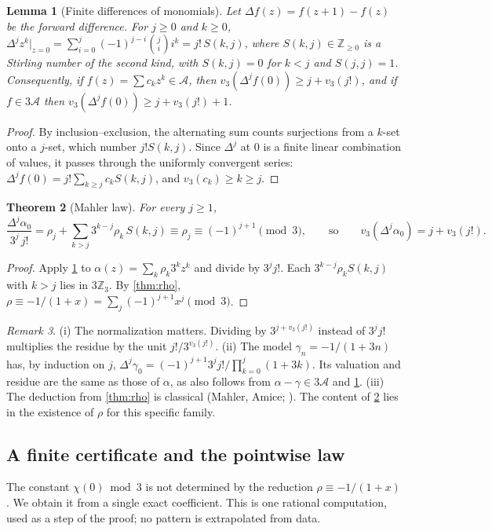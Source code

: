 \documentclass[11pt,reqno]{amsart}
\newtheorem{theorem}{Theorem}[section]
\newtheorem{lemma}[theorem]{Lemma}
\theoremstyle{definition}
\theoremstyle{remark}
\newtheorem{remark}[theorem]{Remark}
\theoremstyle{plain}
\newcommand{\Z}{\mathbb Z}
\newcommand{\cA}{\mathcal A}
\begin{document}
\begin{lemma}[Finite differences of monomials]\label{lem:mahler}
Let $\Delta f(z)=f(z+1)-f(z)$ be the forward difference. For $j\ge0$ and $k\ge0$, $\Delta^jz^k\big|_{z=0}=\sum_{i=0}^j(-1)^{j-i}\binom jii^k=j!\,S(k,j)$, where $S(k,j)\in\Z_{\ge0}$ is a Stirling number of the second kind, with $S(k,j)=0$ for $k<j$ and $S(j,j)=1$. Consequently, if $f(z)=\sum c_kz^k\in\cA$, then $v_3(\Delta^jf(0))\ge j+v_3(j!)$, and if $f\in3\cA$ then $v_3(\Delta^jf(0))\ge j+v_3(j!)+1$.
\end{lemma}

\begin{proof}
By inclusion–exclusion, the alternating sum counts surjections from a $k$-set onto a $j$-set, which number $j!S(k,j)$. Since $\Delta^j$ at $0$ is a finite linear combination of values, it passes through the uniformly convergent series: $\Delta^jf(0)=j!\sum_{k\ge j}c_kS(k,j)$, and $v_3(c_k)\ge k\ge j$.
\end{proof}

\begin{theorem}[Mahler law]\label{thm:mahler}
For every $j\ge1$,
\[
\frac{\Delta^j\alpha_0}{3^j\,j!}=\rho_j+\sum_{k>j}3^{k-j}\rho_k\,S(k,j)\equiv\rho_j\equiv(-1)^{j+1}\pmod 3,\qquad\text{so}\qquad v_3(\Delta^j\alpha_0)=j+v_3(j!).
\]
\end{theorem}

\begin{proof}
Apply \cref{lem:mahler} to $\alpha(z)=\sum_k\rho_k3^kz^k$ and divide by $3^jj!$. Each $3^{k-j}\rho_kS(k,j)$ with $k>j$ lies in $3\Z_3$. By \cref{thm:rho}, $\rho\equiv-1/(1+x)=\sum_j(-1)^{j+1}x^j\pmod3$.
\end{proof}

\begin{remark}
(i) The normalization matters. Dividing by $3^{j+v_3(j!)}$ instead of $3^jj!$ multiplies the residue by the unit $j!/3^{v_3(j!)}$. (ii) The model $\gamma_n=-1/(1+3n)$ has, by induction on $j$, $\Delta^j\gamma_0=(-1)^{j+1}3^jj!\big/\prod_{k=0}^j(1+3k)$. Its valuation and residue are the same as those of $\alpha$, as also follows from $\alpha-\gamma\in3\cA$ and \cref{lem:mahler}. (iii) The deduction from \cref{thm:rho} is classical (Mahler, Amice; \cite{Mahler1958,Amice1964,Robert2000}). The content of \cref{thm:mahler} lies in the existence of $\rho$ for this specific family.
\end{remark}

\subsection{A finite certificate and the pointwise law}
The constant $\chi(0)\bmod3$ is not determined by the reduction $\rho\equiv-1/(1+x)$. We obtain it from a single exact coefficient. This is one rational computation, used as a step of the proof; no pattern is extrapolated from data.
\end{document}
